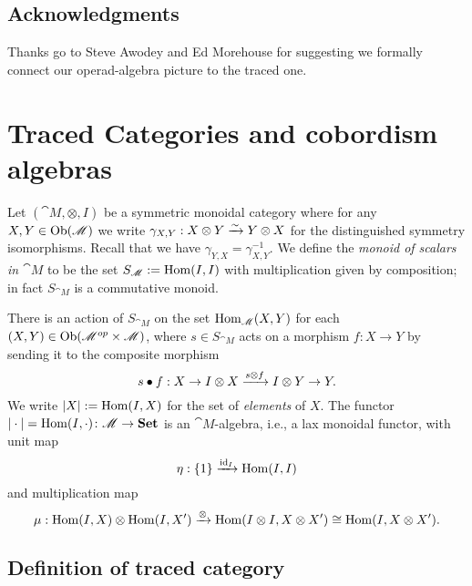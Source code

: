 \documentclass[12pt,oneside,article,draft]{memoir}
\begin{document}
\section*{Acknowledgments}

Thanks go to Steve Awodey and Ed Morehouse for suggesting we formally connect our operad-algebra picture to the traced one. 

\chapter{Traced Categories and cobordism algebras}\label{sec:traced categories}

Let $(\cat{M},\otimes,I)$ be a symmetric monoidal category where for any $X,Y\in\operatorname{Ob}(\mathscr{M})$ we write $\gamma_{X,Y}:X\otimes Y\xrightarrow{\sim} Y\otimes X$ for the distinguished symmetry isomorphisms. Recall that we have $\gamma_{Y,X}=\gamma_{X,Y}^{-1}$.  We define the {\em monoid of scalars in $\cat{M}$} to be the set $S_{\mathscr{M}}:=\operatorname{Hom}(I,I)$ with multiplication given by composition; in fact $S_{\cat{M}}$ is a commutative monoid.  

There is an action of $S_{\cat{M}}$ on the set $\operatorname{Hom}_{\mathscr{M}}(X,Y)$ for each $(X,Y)\in\operatorname{Ob}(\mathscr{M}^{op}\times\mathscr{M})$, where $s\in S_{\cat{M}}$ acts on a morphism $f\colon X\to Y$ by sending it to the composite morphism
$$s\bullet f:X\to I\otimes X\xrightarrow{s\otimes f}I\otimes Y\to Y.$$
We write $|X|:=\operatorname{Hom}(I,X)$ for the set of \emph{elements} of $X$. The functor $|\cdot|=\operatorname{Hom}(I,\cdot)\colon\mathscr{M}\to\mathbf{Set}$ is an $\cat{M}$-algebra, i.e., a lax monoidal functor, with unit map
\[\eta:\{1\}\xrightarrow{\operatorname{id}_{I}}\operatorname{Hom}(I,I)\]
and multiplication map
\[\mu:\operatorname{Hom}(I,X)\otimes\operatorname{Hom}(I,X')\xrightarrow{\otimes}\operatorname{Hom}(I\otimes I,X\otimes X')\cong\operatorname{Hom}(I,X\otimes X').\]

\section{Definition of traced category}\label{sec:define traced}
\end{document}
